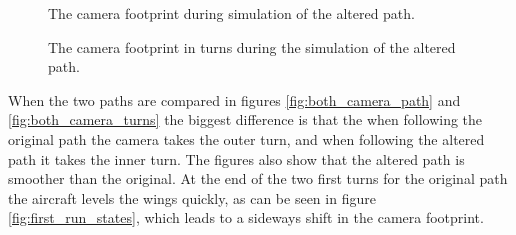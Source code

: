 \begin{figure}[!ht]
    \centering
    \caption{The camera footprint during simulation of the altered path.}
	\label{fig:second_camera_path}
\end{figure}

\begin{figure}[!ht]
    \centering
    \caption{The camera footprint in turns during the simulation of the altered path.}
	\label{fig:second_camera_turns}
\end{figure}

When the two paths are compared in figures \ref{fig:both_camera_path} and \ref{fig:both_camera_turns} the biggest difference is that the when following the original path the camera takes the outer turn, and when following the altered path it takes the inner turn. The figures also show that the altered path is smoother than the original. At the end of the two first turns for the original path the aircraft levels the wings quickly, as can be seen in figure \ref{fig:first_run_states}, which leads to a sideways shift in the camera footprint.

